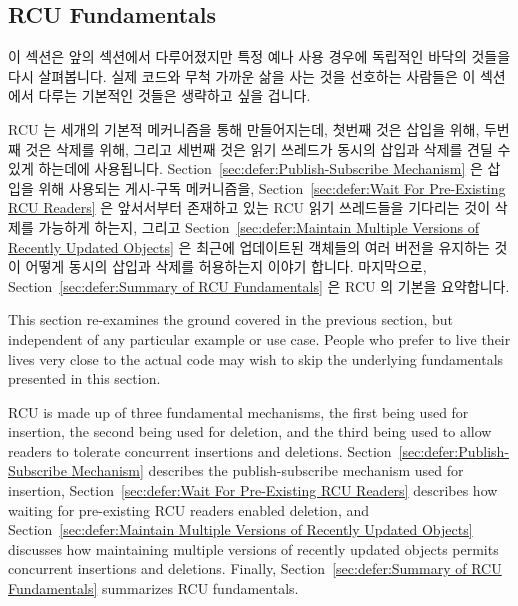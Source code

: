 
\subsection{RCU Fundamentals}
\label{sec:defer:RCU Fundamentals}

이 섹션은 앞의 섹션에서 다루어졌지만 특정 예나 사용 경우에 독립적인 바닥의
것들을 다시 살펴봅니다.
실제 코드와 무척 가까운 삶을 사는 것을 선호하는 사람들은 이 섹션에서 다루는
기본적인 것들은 생략하고 싶을 겁니다.

RCU 는 세개의 기본적 메커니즘을 통해 만들어지는데, 첫번째 것은 삽입을 위해,
두번째 것은 삭제를 위해, 그리고 세번째 것은 읽기 쓰레드가 동시의 삽입과 삭제를
견딜 수 있게 하는데에 사용됩니다.
Section~\ref{sec:defer:Publish-Subscribe Mechanism}
은 삽입을 위해 사용되는 게시-구독 메커니즘을,
Section~\ref{sec:defer:Wait For Pre-Existing RCU Readers}
은 앞서서부터 존재하고 있는 RCU 읽기 쓰레드들을 기다리는 것이 삭제를 가능하게
하는지, 그리고
Section~\ref{sec:defer:Maintain Multiple Versions of Recently Updated Objects}
은 최근에 업데이트된 객체들의 여러 버전을 유지하는 것이 어떻게 동시의 삽입과
삭제를 허용하는지 이야기 합니다.
마지막으로,
Section~\ref{sec:defer:Summary of RCU Fundamentals}
은 RCU 의 기본을 요약합니다.

\iffalse

This section re-examines the ground covered in the previous section, but
independent of any particular example or use case.
People who prefer to live their lives very close to the actual code may
wish to skip the underlying fundamentals presented in this section.

RCU is made up of three fundamental mechanisms, the first being
used for insertion, the second being used for deletion, and the third
being used to allow readers to tolerate concurrent insertions and deletions.
Section~\ref{sec:defer:Publish-Subscribe Mechanism}
describes the publish-subscribe mechanism used for insertion,
Section~\ref{sec:defer:Wait For Pre-Existing RCU Readers}
describes how waiting for pre-existing RCU readers enabled deletion,
and
Section~\ref{sec:defer:Maintain Multiple Versions of Recently Updated Objects}
discusses how maintaining multiple versions of recently updated objects
permits concurrent insertions and deletions.
Finally,
Section~\ref{sec:defer:Summary of RCU Fundamentals}
summarizes RCU fundamentals.

